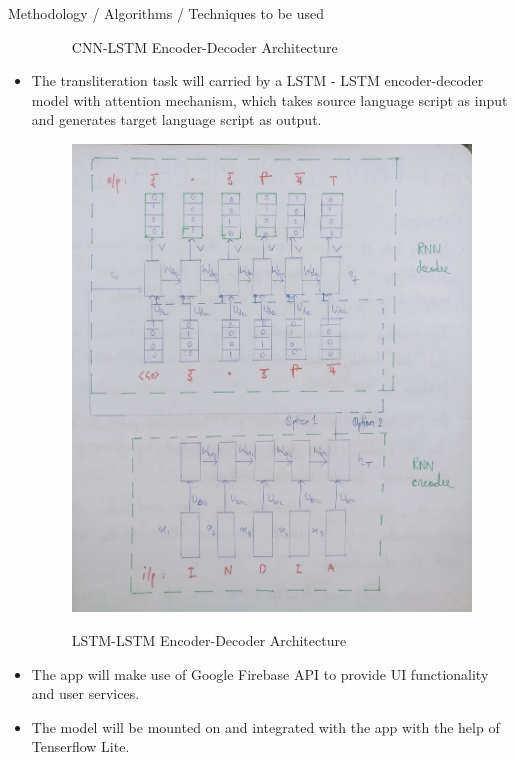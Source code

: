 \documentclass{beamer}
\begin{document}
\begin{frame}[allowframebreaks]{Methodology / Algorithms / Techniques to be used}
\begin{itemize}
\begin{figure}
			\caption{CNN-LSTM Encoder-Decoder Architecture}
			\label{Text_Recognition_Model}
	\end{figure}
	\framebreak
	\item The transliteration task will carried by a LSTM - LSTM encoder-decoder model with attention mechanism, which takes source language script as input and generates target language script as output.
	\begin{figure}
			{\includegraphics[scale=.05]{Text_Transliteration_Model}}
			\caption{LSTM-LSTM Encoder-Decoder Architecture}
			\label{Text_Transliteration_Model}
	\end{figure}
	\framebreak
	\item The app will make use of Google Firebase API to provide UI functionality and user services.
	\item The model will be mounted on and integrated with the app with the help of Tenserflow Lite.
\end{itemize}
\end{frame}
\end{document}
